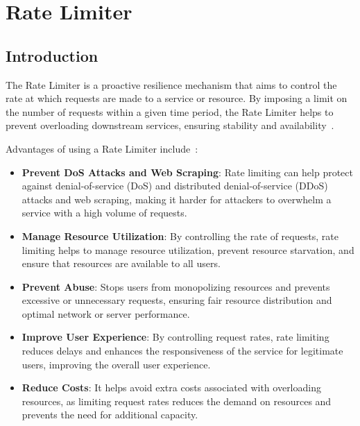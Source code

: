 \chapter{Rate Limiter}\label{ch:rate-limiter}



\section{Introduction}\label{sec:rate-limiter-introduction}

The Rate Limiter is a proactive resilience mechanism
that aims to control the rate at which requests are made to a service or resource.
By imposing a limit on the number of requests within a given time period,
the Rate Limiter helps to prevent overloading downstream services,
ensuring stability and availability~\cite{microsoft-rate-limiting-pattern,cloudflare-rate-limiting}.

Advantages of using a Rate Limiter include~\cite{solo-io-rate-limiting}:

\begin{itemize}
    \item \textbf{Prevent DoS Attacks and Web Scraping}:
    Rate limiting can help protect against denial-of-service (DoS) and distributed denial-of-service (DDoS) attacks and web scraping, making it harder for attackers to overwhelm a service with a high volume of requests.
    \item \textbf{Manage Resource Utilization}: By controlling the rate of requests, rate limiting helps to manage resource utilization, prevent resource starvation, and ensure that resources are available to all users.
    \item \textbf{Prevent Abuse}: Stops users from monopolizing resources and prevents excessive or unnecessary requests, ensuring fair resource distribution and optimal network or server performance.
    \item \textbf{Improve User Experience}: By controlling request rates,
    rate limiting reduces delays and enhances the responsiveness of the service for legitimate users, improving the overall user experience.
    \item \textbf{Reduce Costs}: It helps avoid extra costs associated with overloading resources, as limiting request rates reduces the demand on resources and prevents the need for additional capacity.
\end{itemize}


